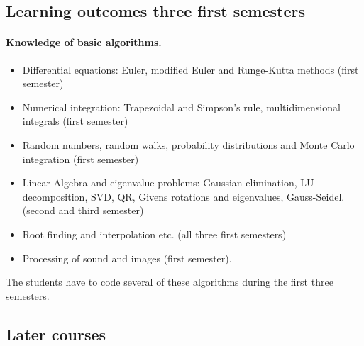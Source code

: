 \documentclass[%
twoside,                 %
final,                   %
10pt]{article}
\begin{document}
\noindent






\subsection*{Learning outcomes three first semesters}

\paragraph{Knowledge of basic algorithms.}

\begin{itemize}
\item Differential equations: Euler, modified Euler and Runge-Kutta methods (first semester)

\item Numerical integration: Trapezoidal and Simpson's rule, multidimensional integrals (first semester)

\item Random numbers, random walks, probability distributions and Monte Carlo integration  (first semester)

\item Linear Algebra and eigenvalue problems: Gaussian elimination, LU-decomposition, SVD, QR, Givens rotations and eigenvalues, Gauss-Seidel. (second and third semester)

\item Root finding and interpolation etc. (all three first semesters)

\item Processing of sound and images (first semester).
\end{itemize}

\noindent
The students have to code several of these algorithms during the first three semesters.




\subsection*{Later courses}

\paragraph{}
\end{document}
